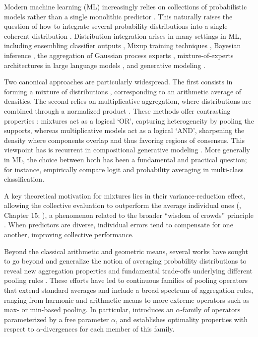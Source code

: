 \documentclass[accepted]{uai2026} %
\begin{document}
Modern machine learning (ML) increasingly relies on collections of probabilistic models rather than a single monolithic predictor \citep{lakshminarayanan2017simple,liu2024deepseek}. This naturally raises the question of how to integrate several probability distributions into a single coherent distribution \citep{french1983group,genest1986combining}. 
Distribution integration arises in many settings in ML, including ensembling classifier outputs \citep[Section~5]{kuncheva2014combining}, Mixup training techniques \citep{el2025mixup}, Bayesian inference \citep{carvalho2023}, the aggregation of Gaussian process experts \citep{liu2018generalized,cohen2021healing}, mixture-of-experts architectures in large language models \citep{liu2024deepseek, cai2025survey}, and generative modeling \citep{liu2022compositional,razafindralambo2026two}. 

Two canonical approaches are particularly widespread. The first consists in forming a mixture of distributions \citep{jacobs1991adaptive,jordan1994hierarchical}, corresponding to an arithmetic average of densities. The second relies on multiplicative aggregation, where distributions are combined through a normalized product \citep{hinton2002training}. These methods offer contrasting properties  \citep{winkler1968consensus}: mixtures act as a logical `OR',  capturing heterogeneity by pooling the supports, whereas multiplicative models act as a logical `AND', sharpening the density where components overlap and thus favoring regions of consensus. This viewpoint has is recurrent in compositional generative modeling \citep{du2023reducereuserecyclecompositional,liu2022compositional}. More generally in ML, the choice between both has been a fundamental and practical question; for instance, \citet{buchanan2023effects} empirically compare logit and probability averaging in multi-class classification.


A key theoretical motivation for mixtures lies in their variance-reduction effect, allowing the collective evaluation to outperform the average individual ones (\citealp{hastie2009elements}, Chapter 15; \citealp{mattei2025ensembles}), a phenomenon related to the broader ``wisdom of crowds'' principle \citep{surowiecki2004wisdom}. When predictors are diverse, individual errors tend to compensate for one another, improving collective performance.


Beyond the classical arithmetic and geometric means, several works have sought to go beyond and generalize the notion of averaging probability distributions \citep{genest1986combining,amari2007integration} to reveal new aggregation properties and fundamental trade-offs underlying different pooling rules \citep{elkin2025opinion}. These efforts have led to continuous families of pooling operators that extend standard averages and include a broad spectrum of aggregation rules, ranging from harmonic and arithmetic means to more extreme operators such as max- or min-based pooling. In particular, \citet{amari2007integration} introduces an $\alpha$-family of operators parameterized by a free parameter $\alpha$, and establishes optimality properties with respect to $\alpha$-divergences for each member of this family.
\end{document}

